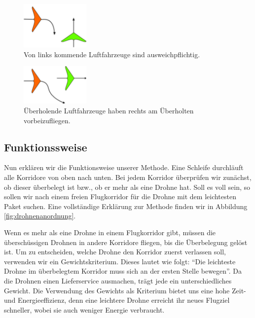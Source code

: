 \documentclass[a4paper,titlepage,onecolumn,twoside,12pt]{article}
\begin{document}
\begin{figure}
\centering
\includegraphics[width=0.3\textwidth]{120px-Crossing_rule}
\caption{Von links kommende Luftfahrzeuge sind ausweichpflichtig.}
\label{fig:cross}
\end{figure}


\begin{figure}
\centering
\includegraphics[width=0.3\textwidth]{120px-Overtaking_rule}
\caption{Überholende Luftfahrzeuge haben rechts am Überholten vorbeizufliegen.}
\label{fig:overtaking}
\end{figure}


\subsection{Funktionssweise}
\label{subsec:funktionssweise}
Nun erklären wir die Funktionsweise unserer Methode. Eine Schleife durchläuft alle Korridore von oben nach unten. Bei jedem Korridor überprüfen wir zunächst, ob dieser überbelegt ist bzw., ob er mehr als eine Drohne hat. Soll es voll sein, so sollen wir nach einem freien Flugkorridor für die Drohne mit dem leichtesten Paket suchen. Eine vollständige Erklärung zur Methode finden wir in Abbildung \ref{fig:drohnenanordnung}.

Wenn es mehr als eine Drohne in einem Flugkorridor gibt, müssen die überschüssigen Drohnen in andere Korridore fliegen, bis die Überbelegung gelöst ist. Um zu entscheiden, welche Drohne den Korridor zuerst verlassen soll, verwenden wir ein Gewichtskriterium. Dieses lautet wie folgt: "`Die leichteste Drohne im überbelegtem Korridor muss sich an der ersten Stelle bewegen"'. Da die Drohnen einen Lieferservice ausmachen, trägt jede ein unterschiedliches Gewicht. Die Verwendung des Gewichts als Kriterium bietet uns eine hohe Zeit- und Energieeffizienz, denn eine leichtere Drohne erreicht ihr neues Flugziel schneller, wobei sie auch weniger Energie verbraucht.
\end{document}
